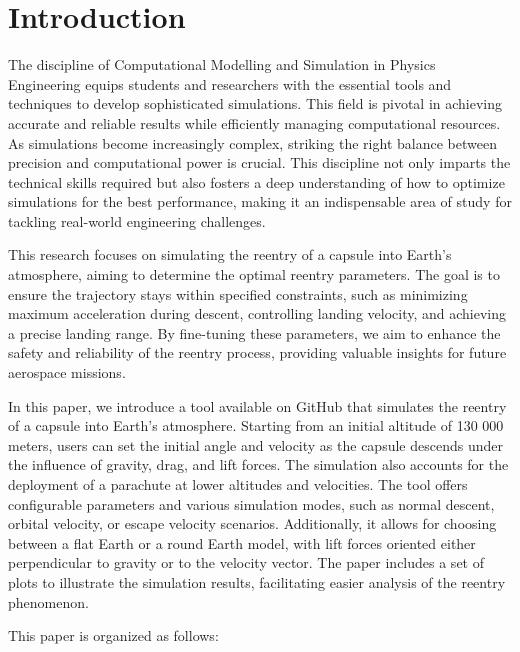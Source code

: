 \documentclass[runningheads]{llncs}
\begin{document}

\section{Introduction}
The discipline of Computational Modelling and Simulation in Physics Engineering equips students and researchers with the essential tools and techniques to develop sophisticated simulations. This field is pivotal in achieving accurate and reliable results while efficiently managing computational resources. As simulations become increasingly complex, striking the right balance between precision and computational power is crucial. This discipline not only imparts the technical skills required but also fosters a deep understanding of how to optimize simulations for the best performance, making it an indispensable area of study for tackling real-world engineering challenges.

This research focuses on simulating the reentry of a capsule into Earth's atmosphere, aiming to determine the optimal reentry parameters. The goal is to ensure the trajectory stays within specified constraints, such as minimizing maximum acceleration during descent, controlling landing velocity, and achieving a precise landing range. By fine-tuning these parameters, we aim to enhance the safety and reliability of the reentry process, providing valuable insights for future aerospace missions.

In this paper, we introduce a tool available on GitHub \cite{git} that simulates the reentry of a capsule into Earth's atmosphere. Starting from an initial altitude of 130 000 meters, users can set the initial angle and velocity as the capsule descends under the influence of gravity, drag, and lift forces. The simulation also accounts for the deployment of a parachute at lower altitudes and velocities. The tool offers configurable parameters and various simulation modes, such as normal descent, orbital velocity, or escape velocity scenarios. Additionally, it allows for choosing between a flat Earth or a round Earth model, with lift forces oriented either perpendicular to gravity or to the velocity vector. The paper includes a set of plots to illustrate the simulation results, facilitating easier analysis of the reentry phenomenon.

This paper is organized as follows:
\end{document}
